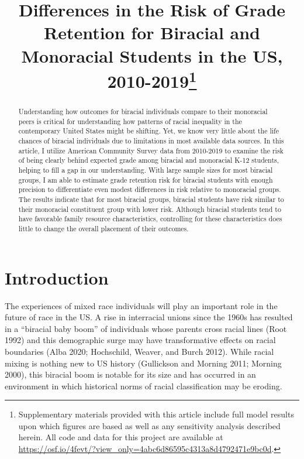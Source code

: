 \documentclass[
  letterpaper,
  DIV=11,
  numbers=noendperiod]{scrartcl}
\title{Differences in the Risk of Grade Retention for Biracial and
Monoracial Students in the US, 2010-2019\thanks{Supplementary materials
provided with this article include full model results upon which figures
are based as well as any sensitivity analysis described herein. All code
and data for this project are available at
\url{https://osf.io/4fevt/?view_only=4abc6d86595c4313a8d4792471e9bc0d}.}}
\author{}
\date{}
\begin{document}
\maketitle
\begin{abstract}
Understanding how outcomes for biracial individuals compare to their
monoracial peers is critical for understanding how patterns of racial
inequality in the contemporary United States might be shifting. Yet, we
know very little about the life chances of biracial individuals due to
limitations in most available data sources. In this article, I utilize
American Community Survey data from 2010-2019 to examine the risk of
being clearly behind expected grade among biracial and monoracial K-12
students, helping to fill a gap in our understanding. With large sample
sizes for most biracial groups, I am able to estimate grade retention
risk for biracial students with enough precision to differentiate even
modest differences in risk relative to monoracial groups. The results
indicate that for most biracial groups, biracial students have risk
similar to their monoracial constituent group with lower risk. Although
biracial students tend to have favorable family resource
characteristics, controlling for these characteristics does little to
change the overall placement of their outcomes.
\end{abstract}
\ifdefined\Shaded\renewenvironment{Shaded}{\begin{tcolorbox}[borderline west={3pt}{0pt}{shadecolor}, enhanced, interior hidden, breakable, boxrule=0pt, frame hidden, sharp corners]}{\end{tcolorbox}}\fi

\hypertarget{introduction}{%
\section{Introduction}\label{introduction}}

The experiences of mixed race individuals will play an important role in
the future of race in the US. A rise in interracial unions since the
1960s has resulted in a ``biracial baby boom'' of individuals whose
parents cross racial lines (Root 1992) and this demographic surge may
have transformative effects on racial boundaries (Alba 2020; Hochschild,
Weaver, and Burch 2012). While racial mixing is nothing new to US
history (Gullickson and Morning 2011; Morning 2000), this biracial boom
is notable for its size and has occurred in an environment in which
historical norms of racial classification may be eroding.
\end{document}
